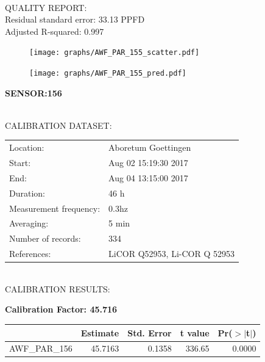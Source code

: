 \documentclass[oneside]{report}
\begin{document}
\hrulefill\\
QUALITY REPORT:\\
Residual standard error: 33.13 PPFD\\
Adjusted R-squared: 0.997



\begin{figure}[H]
  \centering
  \texttt{[image: graphs/AWF\_PAR\_155\_scatter.pdf]}
\end{figure}




\begin{figure}[H]
  \centering
  \texttt{[image: graphs/AWF\_PAR\_155\_pred.pdf]}
\end{figure}

\pagebreak


\begin{center}
\large{\textbf{SENSOR:156}}\\
\end{center}

\hrulefill\\
CALIBRATION DATASET:\\
\begin{table}[h!]
  \centering
  \label{tab:table1}
  \begin{tabular}{ll}
    Location: & Aboretum Goettingen\\ 
    
    
    Start:  & Aug 02 15:19:30 2017 \\
    End:   & Aug 04 13:15:00 2017\\ 
    Duration: & 46 h\\
    Measurement frequency: & 0.3hz\\
    Averaging:  &5 min\\
    Number of records: & 334 \\
    References: & LiCOR Q52953, Li-COR Q 52953 \\
  \end{tabular}
\end{table}

\hrulefill\\
CALIBRATION RESULTS:\\


\begin{center}
\textbf{\large{Calibration Factor: 45.716}}\\
\end{center}
\begin{table}[ht]
\centering
\begin{tabular}{rrrrr}
  \hline
 & Estimate & Std. Error & t value & Pr($>$$|$t$|$) \\ 
  \hline
AWF\_PAR\_156 & 45.7163 & 0.1358 & 336.65 & 0.0000 \\ 
   \hline
\end{tabular}
\end{table}
\end{document}
